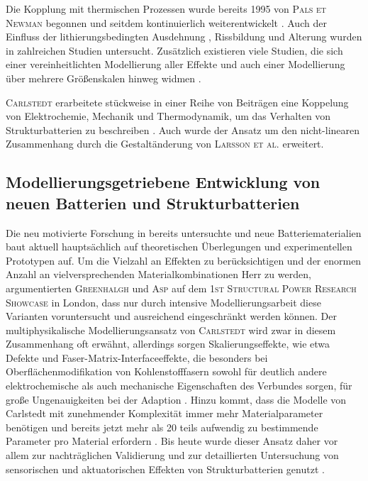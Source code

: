 Die Kopplung mit thermischen Prozessen wurde bereits 1995 von \textsc{Pals et Newman} \cite{Pals1995,Pals1995a} begonnen und seitdem kontinuierlich weiterentwickelt \cite{Chen2005,Onda2006,Kim2013,Gao2021,Liu2023}. Auch der Einfluss der lithierungsbedingten Ausdehnung \cite{Bower2011,Yang2014,Roberts2014,Pereira2019,Mai2019,Li2020,Hoeschele2023}, Rissbildung \cite{Dionisi2017,Wang2020a,Pistorio2023} und Alterung \cite{RedondoIglesias2020} wurden in zahlreichen Studien untersucht. Zusätzlich existieren viele Studien, die sich einer vereinheitlichten Modellierung aller Effekte \cite{Wu2014,Kim2018,Liu2020,Yin2020} und auch einer Modellierung über mehrere Größenskalen hinweg widmen \cite{Liu2019,Li2020a,Katrasnik2021}.

\textsc{Carlstedt} erarbeitete stückweise in einer Reihe von Beiträgen eine Koppelung von Elektrochemie, Mechanik und Thermodynamik, um das Verhalten von Strukturbatterien zu beschreiben \cite{Carlstedt2019,Carlstedt2019a,Carlstedt2019b,Carlstedt2020,Carlstedt2020b,Carlstedt2022,Carlstedt2022a,Carlstedt2022b}. Auch wurde der Ansatz um den nicht-linearen Zusammenhang durch die Gestaltänderung von \textsc{Larsson et al.} \cite{Larsson2023} erweitert.

\subsection{Modellierungsgetriebene Entwicklung von neuen Batterien und Strukturbatterien}

Die neu motivierte Forschung in bereits untersuchte und neue Batteriematerialien baut aktuell hauptsächlich auf theoretischen Überlegungen und experimentellen Prototypen auf. Um die Vielzahl an Effekten zu berücksichtigen und der enormen Anzahl an vielversprechenden Materialkombinationen Herr zu werden, argumentierten \textsc{Greenhalgh} \cite{Greenhalgh2024,Greenhalgh2024a} und \textsc{Asp} \cite{Asp2024} auf dem \textsc{1st Structural Power Research Showcase} in London, dass nur durch intensive Modellierungsarbeit diese Varianten voruntersucht und ausreichend eingeschränkt werden können. Der multiphysikalische Modellierungsansatz von \textsc{Carlstedt} wird zwar in diesem Zusammenhang oft erwähnt, allerdings sorgen Skalierungseffekte, wie etwa Defekte und Faser-Matrix-Interfaceeffekte, die besonders bei Oberflächenmodifikation von Kohlenstofffasern sowohl für deutlich andere elektrochemische als auch mechanische Eigenschaften des Verbundes sorgen, für große Ungenauigkeiten bei der Adaption \cite{Franco2019,Fam2024}. Hinzu kommt, dass die Modelle von Carlstedt mit zunehmender Komplexität immer mehr Materialparameter benötigen und bereits jetzt mehr als 20 teils aufwendig zu bestimmende Parameter pro Material erfordern \cite{Greenhalgh2024a}. Bis heute wurde dieser Ansatz daher vor allem zur nachträglichen Validierung und zur detaillierten Untersuchung von sensorischen und aktuatorischen Effekten von Strukturbatterien genutzt \cite{Carlstedt2023}.


